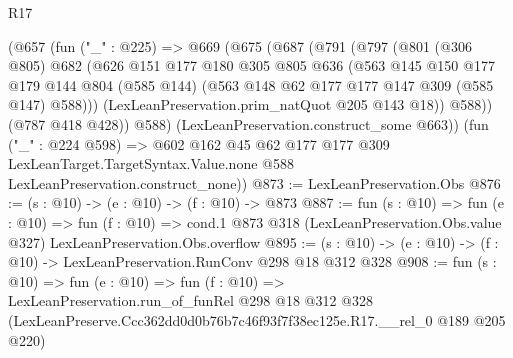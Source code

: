 \begin{lexlean}{R17}
\begin{coremodule}
    (@657
      (fun ("_" : @225) =>
      @669
        (@675
          (@687
            (@791
              (@797
                (@801
                  (@306 @805)
                  @682
                  (@626
                    @151
                    @177
                    @180
                    @305
                    @805
                    @636
                    (@563
                      @145
                      @150
                      @177
                      @179
                      @144
                      @804
                      (@585 @144)
                      (@563 @148 @62 @177 @177 @147 @309 (@585 @147) @588)))
                  (LexLeanPreservation.prim_natQuot @205 @143 @18))
                @588))
            (@787 @418 @428))
          @588)
        (LexLeanPreservation.construct_some @663))
      (fun ("_" : @224 @598) =>
      @602
        @162
        @45
        @62
        @177
        @177
        @309
        LexLeanTarget.TargetSyntax.Value.none
        @588
        LexLeanPreservation.construct_none))
@873 := LexLeanPreservation.Obs
@876 := (s : @10) -> (e : @10) -> (f : @10) -> @873
@887 := fun (s : @10) =>
  fun (e : @10) =>
  fun (f : @10) =>
  cond.{1} @873 @318 (LexLeanPreservation.Obs.value @327) LexLeanPreservation.Obs.overflow
@895 := (s : @10) -> (e : @10) -> (f : @10) -> LexLeanPreservation.RunConv @298 @18 @312 @328
@908 := fun (s : @10) =>
  fun (e : @10) =>
  fun (f : @10) =>
  LexLeanPreservation.run_of_funRel
    @298
    @18
    @312
    @328
    (LexLeanPreserve.Ccc362dd0d0b76b7c46f93f7f38ec125e.R17.__rel_0 @189 @205 @220)
\end{coremodule}
\end{lexlean}
